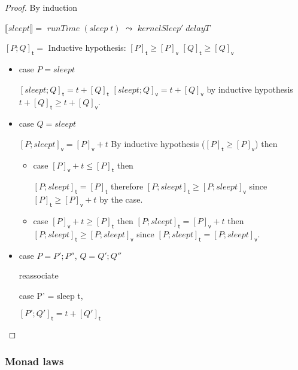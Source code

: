 \documentclass[preprint]{sigplanconf}
\newcommand{\Varid}[1]{\mathit{#1}}
\renewcommand{\leq}{\leqslant}
\renewcommand{\geq}{\geqslant}
\newcommand{\note}[1]{{\color{blue}{#1}}}
\theoremstyle{definition}
\newcommand{\vtime}[1]{[#1]_{\mathsf{v}}}
\newcommand{\etime}[1]{[#1]_{\mathsf{t}}}
\newcommand{\interp}[1]{\llbracket{#1}\rrbracket}
\begin{document}
\note{Rough notes for the proof}
\begin{proof}
By induction %

$\interp{sleep t} = $
\ensuremath{\Varid{runTime}\;(\Varid{sleep}\;\Varid{t})} $\leadsto$ \ensuremath{\Varid{kernelSleep'}\;\Varid{delayT}}

$\etime{P;Q} = $
Inductive hypothesis: $\etime{P} \geq \vtime{P}$
              $\etime{Q} \geq \vtime{Q}$


\begin{itemize}
\item case $P = sleep t$

$\etime{sleep t; Q} = t + \etime{Q}$
$\vtime{sleep t; Q} = t + \vtime{Q}$
by inductive hypothesis $t + \etime{Q} \geq t + \vtime{Q}$.

\item case $Q = sleep t$

$\vtime{P; sleep t} = \vtime{P} + t$
By inductive hypothesis ($\etime{P} \geq \vtime{P}$) then


\begin{itemize}
\item case $\vtime{P} + t \leq \etime{P}$ then

$\etime{P; sleep t} = \etime{P}$
therefore $\etime{P; sleep t} \geq \vtime{P; sleep t}$
since $\etime{P} \geq \vtime{P} + t$ by the case.

\item case $\vtime{P} + t \geq \etime{P}$ then
 $\etime{P; sleep t} = \vtime{P} + t$
then $\etime{P; sleep t} \geq \vtime{P; sleep t}$
since $\etime{P; sleep t} = \vtime{P; sleep t}$.
\end{itemize}

\note{This is actually quite hard. I think I can do it
by using Lemma 1 and 2 together with some reassociating, but
haven't time to sort it right now.}

\item case $P = P';P''$, $Q = Q';Q''$

reassociate

case P' = sleep t,

$\etime{P';Q'} = t + \etime{Q'}$
\end{itemize}

\end{proof}

\subsubsection{Monad laws}
\end{document}

